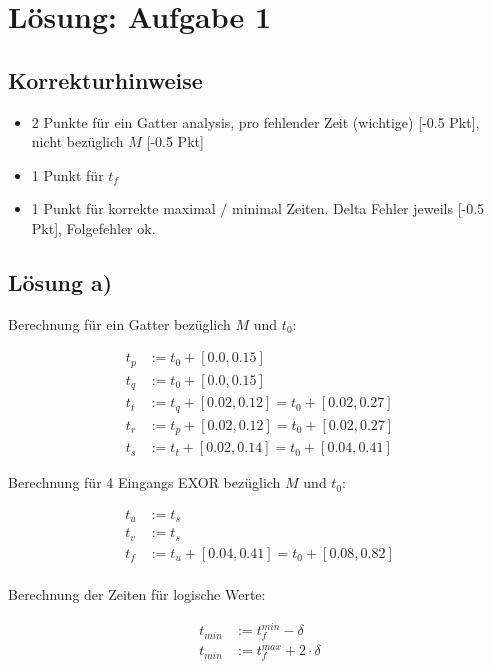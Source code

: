 \documentclass{scrartcl}[9pt, a4paper]
\begin{document}
\section*{Lösung: Aufgabe 1}
\subsection*{Korrekturhinweise}

\begin{itemize}
	\item 2 Punkte für ein Gatter analysis, pro fehlender Zeit (wichtige) [-0.5 Pkt], nicht bezüglich $M$ [-0.5 Pkt]
  \item 1 Punkt für $t_f$
  \item 1 Punkt für korrekte maximal / minimal Zeiten. Delta Fehler jeweils [-0.5 Pkt], Folgefehler ok.
\end{itemize}

\subsection*{Lösung a)}

Berechnung für ein Gatter bezüglich $M$ und $t_0$:

\begin{align*}
	t_p & := t_0 + [0.0, 0.15]                       \\
	t_q & := t_0 + [0.0, 0.15]                       \\
	t_t & := t_q + [0.02, 0.12] = t_0 + [0.02, 0.27] \\
	t_r & := t_p + [0.02, 0.12] = t_0 + [0.02, 0.27] \\
	t_s & := t_t + [0.02, 0.14] = t_0 + [0.04, 0.41]
\end{align*}

Berechnung für 4 Eingangs EXOR bezüglich $M$ und $t_0$:

\begin{align*}
	t_u & := t_s                                     \\
	t_v & := t_s                                     \\
	t_f & := t_u + [0.04, 0.41] = t_0 + [0.08, 0.82] \\
\end{align*}

Berechnung der Zeiten für logische Werte:

\begin{align*}
	t_{min} & := t_f^{min} - \delta         \\
	t_{min} & := t_f^{max} + 2 \cdot \delta \\
\end{align*}
\end{document}
